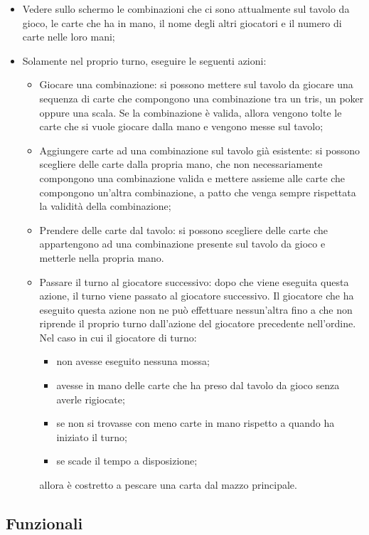\begin{itemize}
    \item Vedere sullo schermo le combinazioni che ci sono attualmente sul tavolo da gioco, le carte che ha in mano, il nome degli altri giocatori e il numero di carte nelle loro mani;
    \item Solamente nel proprio turno, eseguire le seguenti azioni:
    \begin{itemize}
        \item Giocare una combinazione: si possono mettere sul tavolo da giocare una sequenza di carte che compongono una combinazione tra un tris, un poker oppure una scala.
        Se la combinazione è valida, allora vengono tolte le carte che si vuole giocare dalla mano e vengono messe sul tavolo;
        \item Aggiungere carte ad una combinazione sul tavolo già esistente: si possono scegliere delle carte dalla propria mano, che non necessariamente compongono una combinazione valida e mettere assieme alle carte che compongono un’altra combinazione, a patto che venga sempre rispettata la validità della combinazione;
        \item Prendere delle carte dal tavolo: si possono scegliere delle carte che appartengono ad una combinazione presente sul tavolo da gioco e metterle nella propria mano.
        \item Passare il turno al giocatore successivo: dopo che viene eseguita questa azione, il turno viene passato al giocatore successivo.
        Il giocatore che ha eseguito questa azione non ne può effettuare nessun’altra fino a che non riprende il proprio turno dall’azione del giocatore precedente nell’ordine.
        Nel caso in cui il giocatore di turno:
        \begin{itemize}
            \item non avesse eseguito nessuna mossa;
            \item avesse in mano delle carte che ha preso dal tavolo da gioco senza averle rigiocate;
            \item se non si trovasse con meno carte in mano rispetto a quando ha iniziato il turno;
            \item se scade il tempo a disposizione;
        \end{itemize}
        allora è costretto a pescare una carta dal mazzo principale.
    \end{itemize}
\end{itemize}

\subsection{Funzionali}
